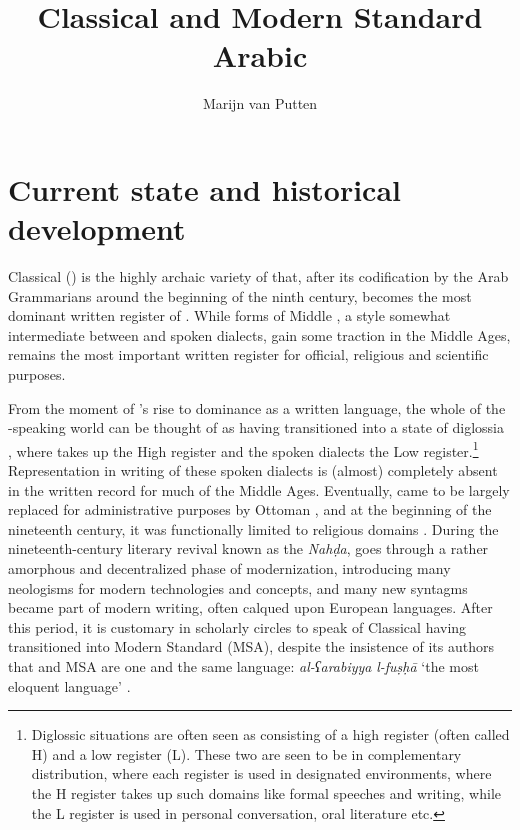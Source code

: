 \documentclass[output=paper]{langsci/langscibook}
\author{Marijn van Putten\affiliation{University of Leiden}}
\title{Classical and Modern Standard Arabic}
\begin{document}
\maketitle 
\let\textstyleannotationreference\relax{}
\section{Current state and historical development}

Classical  () is the highly archaic variety of  that, after its codification by the Arab Grammarians around the beginning of the ninth century, becomes the most dominant written {register} of . While forms of Middle , a style somewhat intermediate between  and spoken dialects, gain some traction in the Middle Ages,  remains the most important written {register} for official, religious and scientific purposes. 

From the moment of ’s rise to dominance as a written language, the whole of the -speaking world can be thought of as having transitioned into a state of {diglossia} \citep{Ferguson1959,Ferguson1996}, where  takes up the High {register} and the spoken dialects the Low {register}.\footnote{Diglossic situations are often seen as consisting of a high {register} (often called H) and a low {register} (L). These two are seen to be in complementary distribution, where each {register} is used in designated environments, where the H {register} takes up such domains like formal speeches and writing, while the L {register} is used in personal conversation, oral literature etc.} Representation in writing of these spoken dialects is (almost) completely absent in the written record for much of the Middle Ages. Eventually,  came to be largely replaced for administrative purposes by Ottoman , and at the beginning of the nineteenth century, it was functionally limited to religious domains \citep[836]{Glaß2011}. During the nineteenth-century  literary revival known as the \textit{Nahḍa},  goes through a rather amorphous and decentralized phase of modernization, introducing many neologisms for modern technologies and concepts, and many new syntagms became part of modern writing, often calqued upon European languages. After this period, it is customary in scholarly circles to speak of Classical  having transitioned into Modern Standard  (MSA), despite the insistence of its authors that  and MSA are one and the same language: \textit{al-ʕarabiyya} \textit{l-fuṣḥā} ‘the most eloquent  language’ \citep[845]{Ryding2011}.
\end{document}
